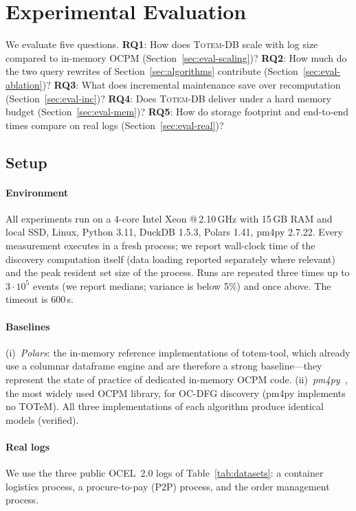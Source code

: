 \documentclass[sigconf, nonacm]{acmart}
\newcommand{\sys}{\textsc{Totem-DB}\xspace}
\newcommand{\ocel}{OCEL~2.0\xspace}
\begin{document}
\section{Experimental Evaluation}
\label{sec:eval}

We evaluate five questions.
\textbf{RQ1}: How does \sys scale with log size compared to in-memory OCPM (Section~\ref{sec:eval-scaling})?
\textbf{RQ2}: How much do the two query rewrites of Section~\ref{sec:algorithms} contribute (Section~\ref{sec:eval-ablation})?
\textbf{RQ3}: What does incremental maintenance save over recomputation (Section~\ref{sec:eval-inc})?
\textbf{RQ4}: Does \sys deliver under a hard memory budget (Section~\ref{sec:eval-mem})?
\textbf{RQ5}: How do storage footprint and end-to-end times compare on real logs (Section~\ref{sec:eval-real})?

\subsection{Setup}
\label{sec:eval-setup}

\paragraph{Environment}
All experiments run on a 4-core Intel Xeon @\,2.10\,GHz with 15\,GB RAM and local SSD, Linux, Python 3.11, DuckDB 1.5.3, Polars 1.41, pm4py 2.7.22. Every measurement executes in a fresh process; we report wall-clock time of the discovery computation itself (data loading reported separately where relevant) and the peak resident set size of the process. Runs are repeated three times up to $3{\cdot}10^5$ events (we report medians; variance is below 5\%) and once above. The timeout is 600\,s.

\paragraph{Baselines}
(i)~\emph{Polars}: the in-memory reference implementations of totem-tool, which already use a columnar dataframe engine and are therefore a strong baseline---they represent the state of practice of dedicated in-memory OCPM code. (ii)~\emph{pm4py}~\cite{pm4py}, the most widely used OCPM library, for OC-DFG discovery (pm4py implements no TOTeM). All three implementations of each algorithm produce identical models (verified).

\paragraph{Real logs}
We use the three public \ocel logs of Table~\ref{tab:datasets}: a container logistics process, a procure-to-pay (P2P) process, and the order management process.
\end{document}
